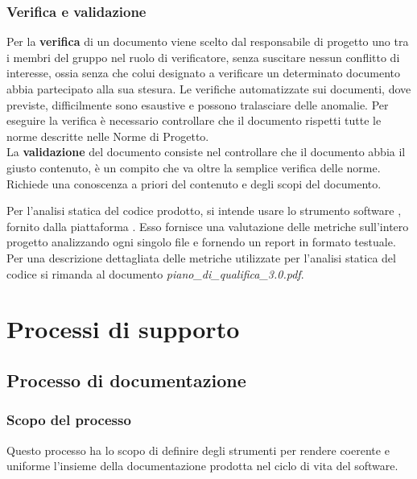 \documentclass[a4paper,11pt]{article}
\begin{document}
	\subsubsection{Verifica e validazione}
	Per la \textbf{verifica} di un documento viene scelto dal responsabile di progetto uno tra i membri del gruppo nel ruolo di verificatore, senza suscitare nessun conflitto di interesse, ossia senza che colui designato a verificare un determinato documento abbia partecipato alla sua stesura.
	 Le verifiche automatizzate sui documenti, dove previste, difficilmente sono esaustive e possono tralasciare delle anomalie. Per eseguire la verifica è necessario controllare che il documento rispetti tutte le norme descritte nelle Norme di Progetto. \\
	La \textbf{validazione} del documento consiste nel controllare che il documento abbia il giusto contenuto, è un compito che va oltre la semplice verifica delle norme. Richiede una conoscenza a priori del contenuto e degli scopi del documento.

Per l'analisi statica del codice  prodotto, si intende usare lo strumento software \textbf{}, fornito dalla piattaforma .
Esso fornisce una valutazione delle metriche sull'intero progetto analizzando ogni singolo file e fornendo un report in formato testuale.
Per una descrizione dettagliata delle metriche utilizzate per l'analisi statica del codice si rimanda al documento \textit{piano\_di\_qualifica\_3.0.pdf}.
		
	\section{Processi di supporto}
		\subsection{Processo di documentazione}
		
			\subsubsection{Scopo del processo}
			Questo processo ha lo scopo di definire degli strumenti per rendere coerente e uniforme l'insieme della documentazione prodotta nel ciclo di vita del software.
			
\end{document}
